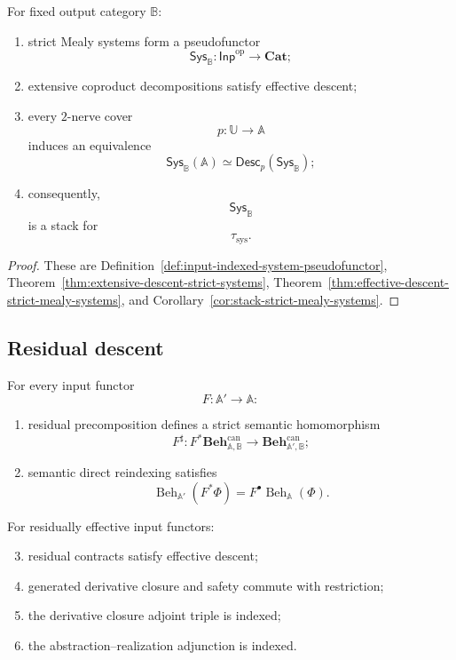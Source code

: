 \begin{theorem}
\label{thm:system-descent-summary}
For fixed output category \(\mathbb B\):
\begin{enumerate}
    \item strict Mealy systems form a pseudofunctor
    \[
        \mathsf{Sys}_{\mathbb B}:
        \mathsf{Inp}^{\mathrm{op}}
        \to
        \mathbf{Cat};
    \]
    \item extensive coproduct decompositions satisfy effective descent;
    \item every \(2\)-nerve cover
    \[
        p:\mathbb U\to\mathbb A
    \]
    induces an equivalence
    \[
        \mathsf{Sys}_{\mathbb B}(\mathbb A)
        \simeq
        \mathsf{Desc}_p
        \left(
            \mathsf{Sys}_{\mathbb B}
        \right);
    \]
    \item consequently,
    \[
        \mathsf{Sys}_{\mathbb B}
    \]
    is a stack for
    \[
        \tau_{\mathrm{sys}}.
    \]
\end{enumerate}
\end{theorem}

\begin{proof}
These are
Definition~\ref{def:input-indexed-system-pseudofunctor},
Theorem~\ref{thm:extensive-descent-strict-systems},
Theorem~\ref{thm:effective-descent-strict-mealy-systems}, and
Corollary~\ref{cor:stack-strict-mealy-systems}.
\end{proof}

\subsection{Residual descent}
\label{subsec:residual-descent-summary}

\begin{theorem}
\label{thm:residual-descent-summary}
For every input functor
\[
    F:\mathbb A'\to\mathbb A:
\]
\begin{enumerate}
    \item residual precomposition defines a strict semantic homomorphism
    \[
        F^\sharp:
        F^\ast
        \mathbf{Beh}^{\mathrm{can}}_{\mathbb A,\mathbb B}
        \to
        \mathbf{Beh}^{\mathrm{can}}_{\mathbb A',\mathbb B};
    \]
    \item semantic direct reindexing satisfies
    \[
        \operatorname{Beh}_{\mathbb A'}(F^\ast\Phi)
        =
        F^\bullet
        \operatorname{Beh}_{\mathbb A}(\Phi).
    \]
\end{enumerate}

For residually effective input functors:
\begin{enumerate}
    \setcounter{enumi}{2}
    \item residual contracts satisfy effective descent;
    \item generated derivative closure and safety commute with restriction;
    \item the derivative closure adjoint triple is indexed;
    \item the abstraction--realization adjunction is indexed.
\end{enumerate}
\end{theorem}

